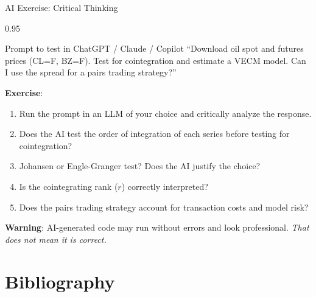\documentclass[9pt, aspectratio=169, t]{beamer}
\begin{document}
\begin{frame}{AI Exercise: Critical Thinking}
    \begin{cminipage}{0.95\textwidth}
    \vspace{-0.3cm}
    \begin{block}{\footnotesize Prompt to test in ChatGPT / Claude / Copilot}
        {\footnotesize
        ``Download oil spot and futures prices (CL=F, BZ=F). Test for cointegration and estimate a VECM model. Can I use the spread for a pairs trading strategy?''
        }
    \end{block}
    \vspace{-2mm}
    {\footnotesize
    \textbf{Exercise}:
    \begin{enumerate}\setlength{\itemsep}{0pt}
        \item Run the prompt in an LLM of your choice and critically analyze the response.
        \item Does the AI test the order of integration of each series before testing for cointegration?
        \item Johansen or Engle-Granger test? Does the AI justify the choice?
        \item Is the cointegrating rank ($r$) correctly interpreted?
        \item Does the pairs trading strategy account for transaction costs and model risk?
    \end{enumerate}
    }
    \vspace{-2mm}
    \begin{alertblock}{}
        {\footnotesize \textbf{Warning}: AI-generated code may run without errors and look professional. \textit{That does not mean it is correct.}}
    \end{alertblock}
    \end{cminipage}
\end{frame}

\section{Bibliography}
\end{document}
